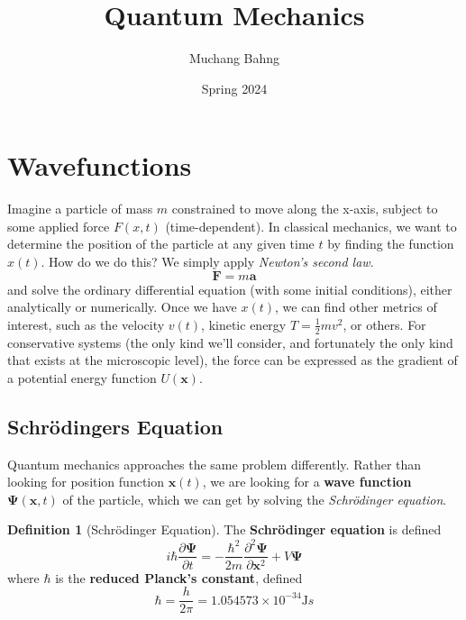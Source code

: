 \documentclass{article}
\theoremstyle{definition}
\newtheorem{definition}{Definition}[section]
\begin{document}
\pagestyle{fancy}

\cfoot{\thepage / \pageref{LastPage}}

\title{Quantum Mechanics}
\author{Muchang Bahng}
\date{Spring 2024}

\maketitle
\tableofcontents
\pagebreak

\section{Wavefunctions} 

  Imagine a particle of mass $m$ constrained to move along the x-axis, subject to some applied force $F(x, t)$ (time-dependent). In classical mechanics, we want to determine the position of the particle at any given time $t$ by finding the function $x(t)$. How do we do this? We simply apply \textit{Newton's second law}. 
  \begin{equation} 
    \mathbf{F} = m \mathbf{a}
  \end{equation}
  and solve the ordinary differential equation (with some initial conditions), either analytically or numerically. Once we have $x(t)$, we can find other metrics of interest, such as the velocity $v(t)$, kinetic energy $T = \frac{1}{2} mv^2$, or others. For conservative systems (the only kind we'll consider, and fortunately the only kind that exists at the microscopic level), the force can be expressed as the gradient of a potential energy function $U(\mathbf{x})$. 

  \subsection{Schr\"odingers Equation}

    Quantum mechanics approaches the same problem differently. Rather than looking for position function $\mathbf{x}(t)$, we are looking for a \textbf{wave function} $\boldsymbol{\Psi}(\mathbf{x}, t)$ of the particle, which we can get by solving the \textit{Schr\"odinger equation}. 

    \begin{definition}[Schr\"odinger Equation]
      The \textbf{Schr\"odinger equation} is defined 
      \begin{equation} 
        i \hbar \frac{\partial \boldsymbol{\Psi}}{\partial t} = - \frac{\hbar^2}{2m} \frac{\partial^2 \boldsymbol{\Psi}}{\partial \mathbf{x}^2} + V \boldsymbol{\Psi}
      \end{equation}
      where $\hbar$ is the \textbf{reduced Planck's constant}, defined 
      \begin{equation} 
        \hbar = \frac{h}{2\pi} = 1.054573 \times 10^{-34} \mathrm{J}s
      \end{equation}
    \end{definition}
\end{document}
